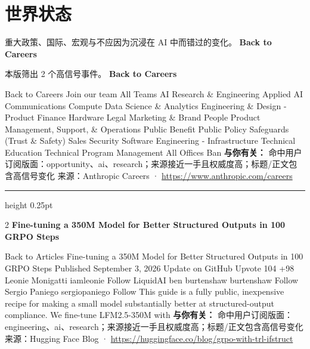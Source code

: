 \documentclass[10.5pt]{ctexart}
\begin{document}
\section*{世界状态}
{\color{ormuted} 重大政策、国际、宏观与不应因为沉浸在 AI 中而错过的变化。}
\vspace{2mm}
{\LARGE\bfseries Back to Careers}\par
\vspace{1mm}
{\color{ormuted} 本版筛出 2 个高信号事件。}
\vspace{3mm}
{\Large\bfseries Back to Careers}\par
Back to Careers Join our team All Teams AI Research \& Engineering Applied AI Communications Compute Data Science \& Analytics Engineering \& Design - Product Finance Hardware Legal Marketing \& Brand People Product Management, Support, \& Operations Public Benefit Public Policy Safeguards (Trust \& Safety) Sales Security Software Engineering - Infrastructure Technical Education Technical Program Management All Offices Ban
\textbf{与你有关：} 命中用户订阅版面：opportunity、ai、research；来源接近一手且权威度高；标题/正文包含高信号变化
{\footnotesize\color{ormuted} 来源：Anthropic Careers · \url{https://www.anthropic.com/careers}}
\vspace{4mm}
\hrule height 0.25pt
\vspace{3mm}
\begin{multicols}{2}
{\large\bfseries Fine-tuning a 350M Model for Better Structured Outputs in 100 GRPO Steps}\par
Back to Articles Fine-tuning a 350M Model for Better Structured Outputs in 100 GRPO Steps Published September 3, 2026 Update on GitHub Upvote 104 +98 Leonie Monigatti iamleonie Follow LiquidAI ben burtenshaw burtenshaw Follow Sergio Paniego sergiopaniego Follow This guide is a fully public, inexpensive recipe for making a small model substantially better at structured-output compliance. We fine-tune LFM2.5-350M with 
\textbf{与你有关：} 命中用户订阅版面：engineering、ai、research；来源接近一手且权威度高；标题/正文包含高信号变化
{\footnotesize\color{ormuted} 来源：Hugging Face Blog · \url{https://huggingface.co/blog/grpo-with-trl-ifstruct}}
\end{multicols}
\end{document}
